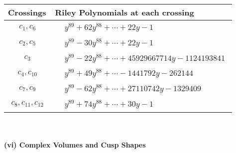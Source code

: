 \documentclass[1p]{elsarticle_modified}
\theoremstyle{definition}
\begin{document}
\begin{tabular}{m{50pt}|m{274pt}}
Crossings & \hspace{64pt}Riley Polynomials at each crossing \\
\hline $$\begin{aligned}c_{1},c_{6}\end{aligned}$$&$\begin{aligned}
&y^{89}+62 y^{88}+\cdots+22 y-1
\end{aligned}$\\
\hline $$\begin{aligned}c_{2},c_{5}\end{aligned}$$&$\begin{aligned}
&y^{89}-30 y^{88}+\cdots+22 y-1
\end{aligned}$\\
\hline $$\begin{aligned}c_{3}\end{aligned}$$&$\begin{aligned}
&y^{89}-22 y^{88}+\cdots+45929667714 y-1124193841
\end{aligned}$\\
\hline $$\begin{aligned}c_{4},c_{10}\end{aligned}$$&$\begin{aligned}
&y^{89}+49 y^{88}+\cdots-1441792 y-262144
\end{aligned}$\\
\hline $$\begin{aligned}c_{7},c_{9}\end{aligned}$$&$\begin{aligned}
&y^{89}-62 y^{88}+\cdots+27110742 y-1329409
\end{aligned}$\\
\hline $$\begin{aligned}c_{8},c_{11},c_{12}\end{aligned}$$&$\begin{aligned}
&y^{89}+74 y^{88}+\cdots+30 y-1
\end{aligned}$\\
\hline
\end{tabular}\\~\\
\newpage\flushleft \textbf{(vi) Complex Volumes and Cusp Shapes}
\end{document}
